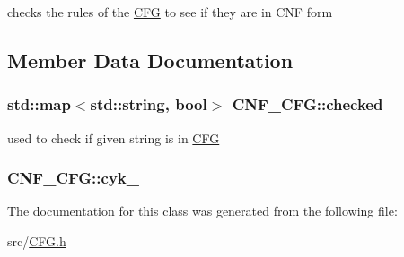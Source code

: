 checks the rules of the \hyperlink{classCFG}{C\-F\-G} to see if they are in C\-N\-F form 

\subsection{Member Data Documentation}
\hypertarget{classCNF__CFG_ac3b39a62d63d5b0fbedf59456355a1f8}{
\subsubsection[{checked}]{\setlength{\rightskip}{0pt plus 5cm}std\-::map$<$std\-::string, bool$>$ C\-N\-F\-\_\-\-C\-F\-G\-::checked\hspace{0.3cm}{\ttfamily [protected]}}}\label{classCNF__CFG_ac3b39a62d63d5b0fbedf59456355a1f8}


used to check if given string is in \hyperlink{classCFG}{C\-F\-G} 

\hypertarget{classCNF__CFG_ad8359be441579098a2df2fd979e2f816}{
\subsubsection[{cyk\-\_\-}]{ C\-N\-F\-\_\-\-C\-F\-G\-::cyk\-\_\-\hspace{0.3cm}{\ttfamily [protected]}}}\label{classCNF__CFG_ad8359be441579098a2df2fd979e2f816}


The documentation for this class was generated from the following file\-:\begin{DoxyCompactItemize}
\item 
src/\hyperlink{CFG_8h}{C\-F\-G.\-h}\end{DoxyCompactItemize}
